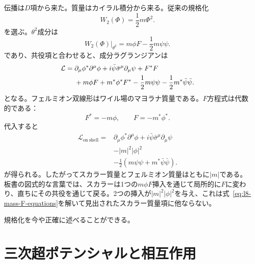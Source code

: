 伝播は\(D\)項から来た。質量はカイラル積分から来る。従来の規格化
\begin{equation}
W_2(\Phi)=\frac12m\Phi^2.
\end{equation}
を選ぶ。\(\theta^2\)成分は
\begin{equation}
\left.W_2(\Phi)\right|_{\theta^2}
=m\phi F-\frac12m\psi\psi.
\end{equation}
であり、共役項と合わせると、成分ラグランジアンは
\begin{align}
\mathcal L
={}&
\partial_\mu\phi^\ast\partial^\mu\phi
+i\bar\psi\bar\sigma^\mu\partial_\mu\psi
+F^\ast F
\notag\\
&+m\phi F+m^\ast\phi^\ast F^\ast
-\frac12m\psi\psi
-\frac12m^\ast\bar\psi\bar\psi.
\label{eq:l8-mass-offshell}
\end{align}
となる。フェルミオン双線形はワイル場のマヨラナ質量である。\(F\)方程式は代数的である：
\begin{equation}
F^\ast=-m\phi,
\qquad
F=-m^\ast\phi^\ast.
\label{eq:l8-mass-F-equations}
\end{equation}
代入すると
\begin{equation}
\begin{aligned}
\mathcal L_{\mathrm{on\ shell}}={}&
\partial_\mu\phi^\ast\partial^\mu\phi
+i\bar\psi\bar\sigma^\mu\partial_\mu\psi\\
&-|m|^2|\phi|^2\\
&-\frac12\left(m\psi\psi+m^\ast\bar\psi\bar\psi\right).
\end{aligned}
\label{eq:l8-mass-onshell}
\end{equation}
が得られる。したがってスカラー質量とフェルミオン質量はともに\(|m|\)である。板書の図式的な言葉では、スカラーは1つの\(m\phi F\)挿入を通じて局所的に\(F\)に変わり、直ちにその共役を通じて戻る。2つの挿入が\(|m|^2|\phi|^2\)を与え、これは式~\eqref{eq:l8-mass-F-equations}を解いて見出されたスカラー質量項に他ならない。

規格化を今や正確に述べることができる。

\section{三次超ポテンシャルと相互作用}

